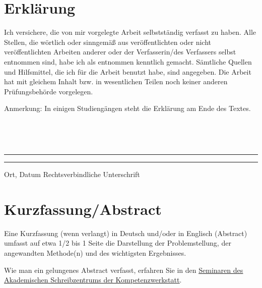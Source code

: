 \documentclass[a4paper,11pt]{article}%
\renewcommand{\\}{\vspace*{0.5\baselineskip} \newline}
\begin{document}

\pagestyle{fancy}

\newpage

\section*{Erklärung}

Ich versichere, die von mir vorgelegte Arbeit selbstständig verfasst zu haben. Alle Stellen, die wörtlich oder sinngemäß aus veröffentlichten oder nicht veröffentlichten Arbeiten anderer oder der Verfasserin/des Verfassers selbst entnommen sind, habe ich als entnommen kenntlich gemacht. Sämtliche Quellen und Hilfsmittel, die ich für die Arbeit benutzt habe, sind angegeben. Die Arbeit hat mit gleichem Inhalt bzw. in wesentlichen Teilen noch keiner anderen Prüfungsbehörde vorgelegen.\\

Anmerkung: In einigen Studiengängen steht die Erklärung am Ende des Textes.\\

~\\

~\\

\rule{0.35\textwidth}{0.4pt} \hspace*{3cm} \rule{0.45\textwidth}{0.4pt} \newline

Ort, Datum	\hspace*{6.3cm}	Rechtsverbindliche Unterschrift

\newpage

\section*{Kurzfassung/Abstract}

Eine Kurzfassung (wenn verlangt) in Deutsch und/oder in Englisch (Abstract) umfasst auf etwa 1/2 bis 1 Seite die Darstellung der Problemstellung, der angewandten Methode(n) und des wichtigsten Ergebnisses.\\

Wie man ein gelungenes Abstract verfasst, erfahren Sie in den \href{https://www.th-koeln.de/studium/schluesselkompetenzen_25490.php}{\underline{Seminaren des Akademischen} \underline{Schreibzentrums der Kompetenzwerkstatt}}.\\
\end{document}
